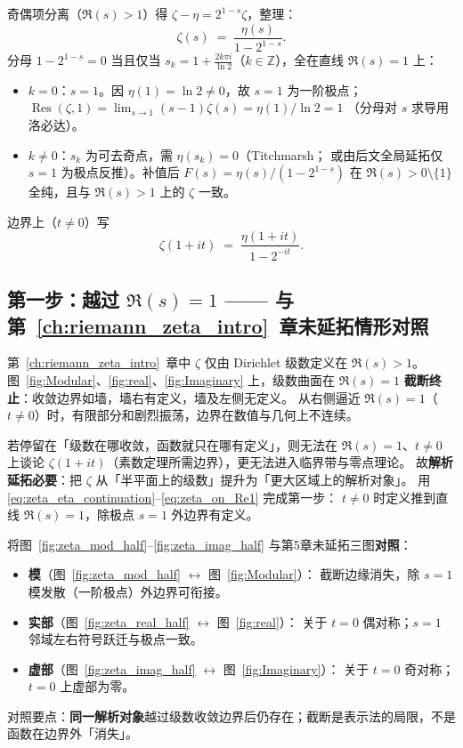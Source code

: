 奇偶项分离（$\Re(s)>1$）得 $\zeta-\eta=2^{1-s}\zeta$，整理：
\begin{equation}
\label{eq:zeta_eta_continuation}
  \zeta(s) \;=\; \frac{\eta(s)}{1 - 2^{1-s}}.
\end{equation}
分母 $1-2^{1-s}=0$ 当且仅当
$s_k=1+\frac{2k\pi i}{\ln 2}$（$k\in\mathbb{Z}$），全在直线 $\Re(s)=1$ 上：
\begin{itemize}
  \item $k=0$：$s=1$。因 $\eta(1)=\ln 2\neq 0$，故 $s=1$ 为一阶极点；
    $\operatorname{Res}(\zeta,1)=\lim_{s\to1}(s-1)\zeta(s)=\eta(1)/\ln 2=1$
    （分母对 $s$ 求导用洛必达）。
  \item $k\neq0$：$s_k$ 为可去奇点，需 $\eta(s_k)=0$（Titchmarsh；
    或由后文全局延拓仅 $s=1$ 为极点反推）。补值后
    $F(s)=\eta(s)/(1-2^{1-s})$ 在 $\Re(s)>0\setminus\{1\}$ 全纯，且与 $\Re(s)>1$ 上的 $\zeta$ 一致。
\end{itemize}
边界上（$t\neq0$）写
\begin{equation}
  \zeta(1+it) \;=\; \frac{\eta(1+it)}{1 - 2^{-it}}.
  \label{eq:zeta_on_Re1}
\end{equation}

\subsection{第一步：越过 \texorpdfstring{$\Re(s)=1$}{Re(s)=1}
—— 与第~\ref{ch:riemann_zeta_intro}~章未延拓情形对照}

第~\ref{ch:riemann_zeta_intro}~章中 $\zeta$ 仅由 Dirichlet 级数定义在 $\Re(s)>1$。
图~\ref{fig:Modular}、\ref{fig:real}、\ref{fig:Imaginary} 上，级数曲面在 $\Re(s)=1$
\textbf{截断终止}：收敛边界如墙，墙右有定义，墙及左侧无定义。
从右侧逼近 $\Re(s)=1$（$t\neq0$）时，有限部分和剧烈振荡，边界在数值与几何上不连续。

若停留在「级数在哪收敛，函数就只在哪有定义」，则无法在 $\Re(s)=1$、$t\neq0$ 上谈论
$\zeta(1+it)$（素数定理所需边界），更无法进入临界带与零点理论。
故\textbf{解析延拓必要}：把 $\zeta$ 从「半平面上的级数」提升为「更大区域上的解析对象」。
用 \eqref{eq:zeta_eta_continuation}--\eqref{eq:zeta_on_Re1} 完成第一步：
$t\neq0$ 时定义推到直线 $\Re(s)=1$，除极点 $s=1$ 外边界有定义。

将图~\ref{fig:zeta_mod_half}--\ref{fig:zeta_imag_half} 与第5章未延拓三图\textbf{对照}：
\begin{itemize}
  \item \textbf{模}（图~\ref{fig:zeta_mod_half} $\leftrightarrow$ 图~\ref{fig:Modular}）：
        截断边缘消失，除 $s=1$ 模发散（一阶极点）外边界可衔接。
  \item \textbf{实部}（图~\ref{fig:zeta_real_half} $\leftrightarrow$ 图~\ref{fig:real}）：
        关于 $t=0$ 偶对称；$s=1$ 邻域左右符号跃迁与极点一致。
  \item \textbf{虚部}（图~\ref{fig:zeta_imag_half} $\leftrightarrow$ 图~\ref{fig:Imaginary}）：
        关于 $t=0$ 奇对称；$t=0$ 上虚部为零。
\end{itemize}
对照要点：\textbf{同一解析对象}越过级数收敛边界后仍存在；截断是表示法的局限，不是函数在边界外「消失」。

